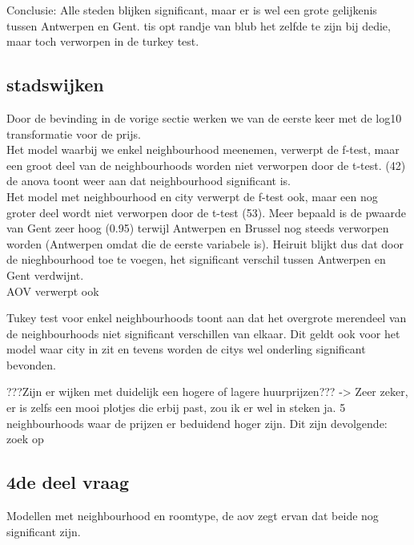 \documentclass[a4paper,kulak]{kulakarticle} %
\begin{document}
Conclusie: Alle steden blijken significant, maar er is wel een grote gelijkenis tussen Antwerpen en Gent. tis opt randje van blub het zelfde te zijn bij dedie, maar toch verworpen in de turkey test.\\

\subsection{stadswijken}
Door de bevinding in de vorige sectie werken we van de eerste keer met de log10 transformatie voor de prijs. \\

Het model waarbij we enkel neighbourhood meenemen, verwerpt de f-test, maar een groot deel van de neighbourhoods worden niet verworpen door de t-test. (42) \\

de anova toont weer aan dat neighbourhood significant is.\\

Het model met neighbourhood en city verwerpt de f-test ook, maar een nog groter deel wordt niet verworpen door de t-test (53). Meer bepaald is de pwaarde van Gent zeer hoog (0.95) terwijl Antwerpen en Brussel nog steeds verworpen worden (Antwerpen omdat die de eerste variabele is). Heiruit blijkt dus dat door de nieghbourhood toe te voegen, het significant verschil tussen Antwerpen en Gent verdwijnt. \\



AOV verwerpt ook 

Tukey test voor enkel neighbourhoods toont aan dat het overgrote merendeel van de neighbourhoods niet significant verschillen van elkaar. Dit geldt ook voor het model waar city in zit en tevens worden de citys wel onderling significant bevonden. 

???Zijn er wijken met duidelijk een hogere of lagere huurprijzen??? -> Zeer zeker, er is zelfs een mooi plotjes die erbij past, zou ik er wel in steken ja. 5 neighbourhoods waar de prijzen er beduidend hoger zijn. Dit zijn devolgende: zoek op\\

\subsection{4de deel vraag}
Modellen met neighbourhood en roomtype, de aov zegt ervan dat beide nog significant zijn. 
\end{document}
